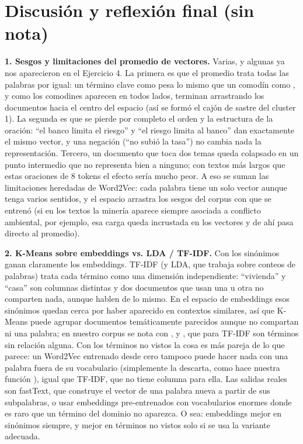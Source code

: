 \section{Discusión y reflexión final (sin nota)}

\textbf{1. Sesgos y limitaciones del promedio de vectores.} Varias, y algunas ya nos aparecieron en el Ejercicio 4. La primera es que el promedio trata todas las palabras por igual: un término clave como  pesa lo mismo que un comodín como , y como los comodines aparecen en todos lados, terminan arrastrando los documentos hacia el centro del espacio (así se formó el cajón de sastre del cluster 1). La segunda es que se pierde por completo el orden y la estructura de la oración: ``el banco limita el riesgo'' y ``el riesgo limita al banco'' dan exactamente el mismo vector, y una negación (``no subió la tasa'') no cambia nada la representación. Tercero, un documento que toca dos temas queda colapsado en un punto intermedio que no representa bien a ninguno; con textos más largos que estas oraciones de 8 tokens el efecto sería mucho peor. A eso se suman las limitaciones heredadas de Word2Vec: cada palabra tiene un solo vector aunque tenga varios sentidos, y el espacio arrastra los sesgos del corpus con que se entrenó (si en los textos la minería aparece siempre asociada a conflicto ambiental, por ejemplo, esa carga queda incrustada en los vectores y de ahí pasa directo al promedio).

\textbf{2. K-Means sobre embeddings vs. LDA / TF-IDF.} Con los sinónimos ganan claramente los embeddings. TF-IDF (y LDA, que trabaja sobre conteos de palabras) trata cada término como una dimensión independiente: ``vivienda'' y ``casa'' son columnas distintas y dos documentos que usan una u otra no comparten nada, aunque hablen de lo mismo. En el espacio de embeddings esos sinónimos quedan cerca por haber aparecido en contextos similares, así que K-Means puede agrupar documentos temáticamente parecidos aunque no compartan ni una palabra; en nuestro corpus se nota con ,  y , que para TF-IDF son términos sin relación alguna. Con los términos no vistos la cosa es más pareja de lo que parece: un Word2Vec entrenado desde cero tampoco puede hacer nada con una palabra fuera de su vocabulario (simplemente la descarta, como hace nuestra función ), igual que TF-IDF, que no tiene columna para ella. Las salidas reales son fastText, que construye el vector de una palabra nueva a partir de sus subpalabras, o usar embeddings pre-entrenados con vocabularios enormes donde es raro que un término del dominio no aparezca. O sea: embeddings mejor en sinónimos siempre, y mejor en términos no vistos solo si se usa la variante adecuada.

